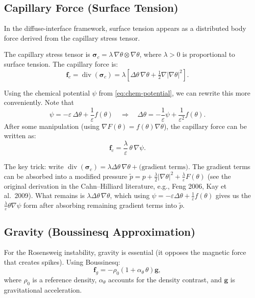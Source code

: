 \documentclass[11pt,a4paper]{article}
\theoremstyle{definition}
\theoremstyle{remark}
\newcommand{\dv}{\operatorname{div}}
\newcommand{\grad}{\nabla}
\newcommand{\eps}{\varepsilon}
\newcommand{\half}{\tfrac{1}{2}}
\newcommand{\bff}{\bm{f}}
\begin{document}
\subsection{Capillary Force (Surface Tension)}
\label{sec:capillary}

In the diffuse-interface framework, surface tension appears as a
distributed body force derived from the capillary stress tensor.

The capillary stress tensor is
$\bm{\sigma}_c = \lambda\,\grad\theta \otimes \grad\theta$,
where $\lambda > 0$ is proportional to surface tension.
The capillary force is:
\begin{equation}
  \label{eq:capillary-force-div}
  \bff_c = \dv(\bm{\sigma}_c) = \lambda\left[
    \Delta\theta\,\grad\theta
    + \half\grad|\grad\theta|^2
  \right].
\end{equation}

Using the chemical potential $\psi$ from \eqref{eq:chem-potential}, we
can rewrite this more conveniently. Note that
\[
  \psi = -\eps\,\Delta\theta + \frac{1}{\eps}f(\theta)
  \quad \Longrightarrow \quad
  \Delta\theta = -\frac{1}{\eps}\psi + \frac{1}{\eps^2}f(\theta).
\]
After some manipulation (using $\grad F(\theta) = f(\theta)\grad\theta$),
the capillary force can be written as:
\begin{equation}
  \label{eq:capillary-force}
  \boxed{
    \bff_c = \frac{\lambda}{\eps}\,\theta\,\grad\psi.
  }
\end{equation}

\begin{derivnote}
The key trick: write
$\dv(\bm{\sigma}_c) = \lambda\Delta\theta\,\grad\theta + \text{(gradient terms)}$.
The gradient terms can be absorbed into a modified pressure
$\tilde{p} = p + \frac{\lambda}{2}|\grad\theta|^2 + \frac{\lambda}{\eps}F(\theta)$
(see the original derivation in the Cahn--Hilliard literature, e.g.,
Feng 2006, Kay et al.\ 2009). What remains is
$\lambda\Delta\theta\,\grad\theta$, which using
$\psi = -\eps\Delta\theta + \frac{1}{\eps}f(\theta)$ gives us the
$\frac{\lambda}{\eps}\theta\grad\psi$ form after absorbing remaining
gradient terms into $\tilde{p}$.
\end{derivnote}

\subsection{Gravity (Boussinesq Approximation)}

For the Rosensweig instability, gravity is essential (it opposes the
magnetic force that creates spikes). Using Boussinesq:
\begin{equation}
  \label{eq:gravity}
  \bff_g = -\rho_0\left(1 + \alpha_\theta\,\theta\right)\bm{g},
\end{equation}
where $\rho_0$ is a reference density, $\alpha_\theta$ accounts for the
density contrast, and $\bm{g}$ is gravitational acceleration.
\end{document}
